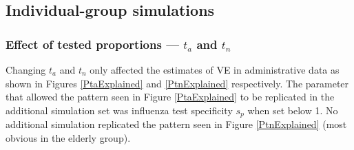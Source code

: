 \documentclass[11pt]{article}
\begin{document}
\subsection{Individual-group simulations}

\subsubsection{Effect of tested proportions --- $t_a$ and $t_n$}

Changing $t_a$ and $t_n$ only affected the estimates of VE in administrative data as shown in Figures \ref{PtaExplained} and \ref{PtnExplained} respectively. The parameter that allowed the pattern seen in Figure \ref{PtaExplained} to be replicated in the additional simulation set was influenza test specificity $s_p$ when set below 1. No additional simulation replicated the pattern seen in Figure \ref{PtnExplained} (most obvious in the elderly group).

\pagebreak
\thispagestyle{plain}

\end{document}
